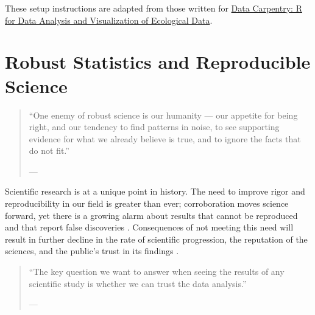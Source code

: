 \documentclass[12pt, krantz2,]{krantz}
\theoremstyle{definition}
\theoremstyle{definition}
\theoremstyle{definition}
\newcommand{\1}{\mathbbm{1}}
\begin{document}
These setup instructions are adapted from those written for \href{http://www.datacarpentry.org/R-ecology-lesson/}{Data Carpentry: R
for Data Analysis and Visualization of Ecological
Data}.

\hypertarget{robust}{%
\section{Robust Statistics and Reproducible Science}\label{robust}}

\begin{quote}
``One enemy of robust science is our humanity --- our appetite for
being right, and our tendency to find patterns in noise, to see supporting
evidence for what we already believe is true, and to ignore the facts that do
not fit.''

--- \citet{naturenews_2015}
\end{quote}

Scientific research is at a unique point in history. The need to improve rigor
and reproducibility in our field is greater than ever; corroboration moves
science forward, yet there is a growing alarm about results that cannot be
reproduced and that report false discoveries \citep{baker2016there}. Consequences of
not meeting this need will result in further decline in the rate of scientific
progression, the reputation of the sciences, and the public's trust in its
findings \citep{munafo2017manifesto, naturenews2_2015}.

\begin{quote}
``The key question we want to answer when seeing the results of any scientific
study is whether we can trust the data analysis.''

--- \citet{peng2015reproducibility}
\end{quote}
\end{document}
